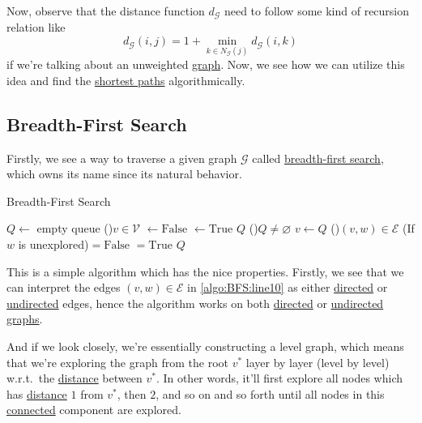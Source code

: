 Now, observe that the distance function \(d_{\mathcal{G} } \) need to follow some kind of recursion relation like
\[
	d_{\mathcal{G} } (i, j) = 1 + \min_{k\in N_{\mathcal{G} } (j)} d_{\mathcal{G} } (i, k)
\]
if we're talking about an unweighted \hyperref[def:graph]{graph}. Now, we see how we can utilize this idea and find the \hyperref[def:shortest-path]{shortest paths} algorithmically.

\subsection{Breadth-First Search}
Firstly, we see a way to traverse a given graph \(\mathcal{G} \) called \hyperref[algo:BFS]{breadth-first search}, which owns its name since its natural behavior.

\begin{algorithm}[H]\label{algo:BFS}
	\DontPrintSemicolon
	\caption{Breadth-First Search}
	\BlankLine
	\(Q\gets \) empty queue
	\For(){\(v\in \mathcal{V} \)}{
		\(\gets \mathrm{False}\)
	}
	\;
	\(\gets \mathrm{True}\) 
	\(Q\)\;
	\;
	\While(){\(Q\neq \varnothing \)}{
		\(v\gets Q\)\pop{}\;
		\For(\label{algo:BFS:line10}){\((v, w)\in\mathcal{E}\)}{
			\If(If \(w\) is unexplored){\(= \mathrm{False}\)}{
				\(=\mathrm{True}\)
				\(Q\)\;
			}
		}
	}
	\Return{}\;
\end{algorithm}

This is a simple algorithm which has the nice properties. Firstly, we see that we can interpret the edges \((v, w)\in \mathcal{E} \) in \autoref{algo:BFS:line10} as either \hyperref[def:directed-graph]{directed} or \hyperref[def:undirected-graph]{undirected} edges, hence the algorithm works on both \hyperref[def:directed-graph]{directed} or \hyperref[def:undirected-graph]{undirected graphs}.

\begin{intuition}
	And if we look closely, we're essentially constructing a level graph, which means that we're exploring the graph from the root \(v^{\ast} \) layer by layer (level by level) w.r.t.\ the \hyperref[def:distance-between-nodes]{distance} between \(v^{\ast}\). In other words, it'll first explore all nodes which has \hyperref[def:distance-between-nodes]{distance} \(1\) from \(v^{\ast} \), then \(2\), and so on and so forth until all nodes in this \hyperref[def:connected]{connected} component are explored.
\end{intuition}

